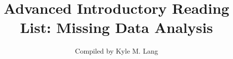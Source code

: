 \documentclass[12pt]{article}
\title{Advanced Introductory Reading List: Missing Data Analysis}
\author{Compiled by Kyle M. Lang}
\begin{document}
\maketitle

\nocite{rubin:1976, rubin:1978, rubin:1996}
\nocite{dempsterEtAl:1977}
\nocite{raghunathanEtAl:2001}
\nocite{vanBuurenEtAl:2006}
\nocite{tannerWong:1987}
\nocite{collinsEtAl:2001}
\nocite{anderson:1957}
\nocite{allison:1987}
\nocite{orchardWoodbury:1972}
\nocite{savaleiRhemtulla:2012}
\nocite{graham:2003}
\nocite{honakerKing:2010}
\nocite{little:1988, andridgeLittle:2010}
\nocite{vonHippel:2009}
\nocite{sterneEtAl:2009, whiteEtAl:2011}



\end{document}
